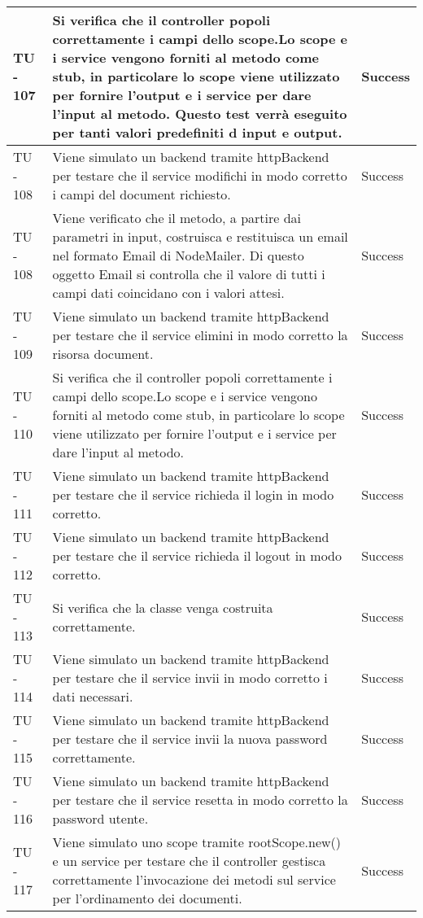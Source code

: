 \begin{center}
\begin{longtable}{ | p{3cm} | p{9cm} | p{2cm} | }
TU - 107 & Si verifica che il controller popoli correttamente i campi dello scope.Lo scope e i service vengono forniti al metodo come stub, in particolare lo scope viene utilizzato per fornire l'output e i service per dare l'input al metodo. Questo test verrà eseguito per tanti valori predefiniti d input e output. & Success \\ \hline
TU - 108 & Viene simulato un backend tramite httpBackend per testare che il service modifichi in modo corretto i campi del document richiesto. & Success \\ \hline
TU - 108 & Viene verificato che il metodo, a partire dai parametri in input, costruisca e restituisca un email nel formato Email di NodeMailer. Di questo oggetto Email si controlla che il valore di tutti i campi dati coincidano con i valori attesi. & Success \\ \hline
TU - 109 & Viene simulato un backend tramite httpBackend per testare che il service elimini in modo corretto la risorsa document. & Success \\ \hline
TU - 110 & Si verifica che il controller popoli correttamente i campi dello scope.Lo scope e i service vengono forniti al metodo come stub, in particolare lo scope viene utilizzato per fornire l'output e i service per dare l'input al metodo. & Success \\ \hline
TU - 111 & Viene simulato un backend tramite httpBackend per testare che il service richieda il login in modo corretto. & Success \\ \hline
TU - 112 & Viene simulato un backend tramite httpBackend per testare che il service richieda il logout in modo corretto. & Success \\ \hline
TU - 113 & Si verifica che la classe venga costruita correttamente. & Success \\ \hline
TU - 114 & Viene simulato un backend tramite httpBackend per testare che il service invii in modo corretto i dati necessari. & Success \\ \hline
TU - 115 & Viene simulato un backend tramite httpBackend per testare che il service invii la nuova password correttamente.  & Success \\ \hline
TU - 116 & Viene simulato un backend tramite httpBackend per testare che il service resetta in modo corretto la password utente. & Success \\ \hline
TU - 117 & Viene simulato uno scope tramite rootScope.new() e un service per testare che il controller gestisca correttamente l'invocazione dei metodi sul service per l'ordinamento dei documenti. & Success \\ \hline

\end{longtable}
\end{center}

